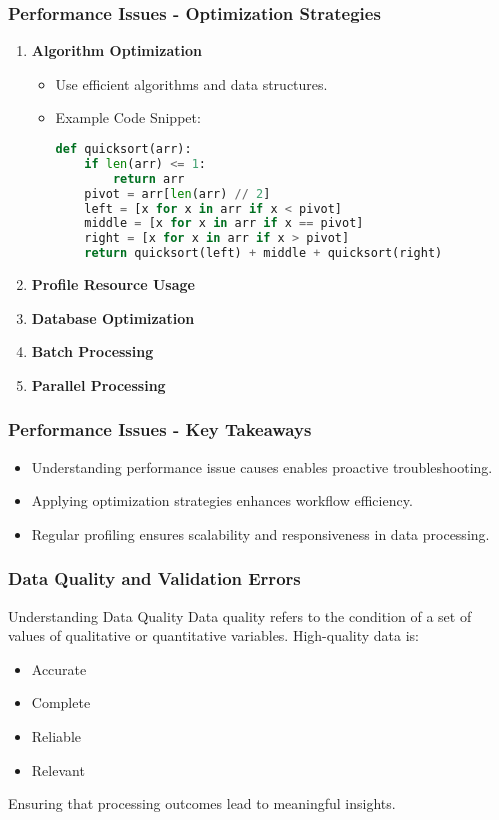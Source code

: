 \documentclass[aspectratio=169]{beamer}
\begin{document}
\begin{frame}[fragile]
    \frametitle{Performance Issues - Optimization Strategies}
    \begin{enumerate}
        \item \textbf{Algorithm Optimization}
            \begin{itemize}
                \item Use efficient algorithms and data structures.
                \item Example Code Snippet:
                \begin{lstlisting}[language=Python]
def quicksort(arr):
    if len(arr) <= 1:
        return arr
    pivot = arr[len(arr) // 2]
    left = [x for x in arr if x < pivot]
    middle = [x for x in arr if x == pivot]
    right = [x for x in arr if x > pivot]
    return quicksort(left) + middle + quicksort(right)
                \end{lstlisting}
            \end{itemize}

        \item \textbf{Profile Resource Usage}
        \item \textbf{Database Optimization}
        \item \textbf{Batch Processing}
        \item \textbf{Parallel Processing}
    \end{enumerate}
\end{frame}

\begin{frame}[fragile]
    \frametitle{Performance Issues - Key Takeaways}
    \begin{itemize}
        \item Understanding performance issue causes enables proactive troubleshooting.
        \item Applying optimization strategies enhances workflow efficiency.
        \item Regular profiling ensures scalability and responsiveness in data processing.
    \end{itemize}
\end{frame}

\begin{frame}
    \frametitle{Data Quality and Validation Errors}
    \begin{block}{Understanding Data Quality}
        Data quality refers to the condition of a set of values of qualitative or quantitative variables. High-quality data is:
        \begin{itemize}
            \item Accurate
            \item Complete
            \item Reliable
            \item Relevant
        \end{itemize}
        Ensuring that processing outcomes lead to meaningful insights.
    \end{block}
\end{frame}
\end{document}
